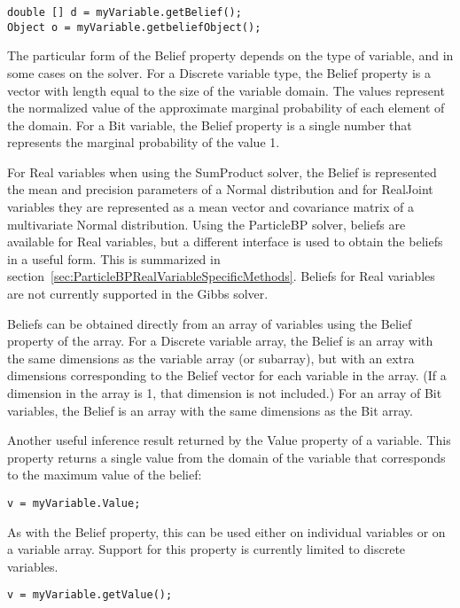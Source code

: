 \begin{lstlisting}
double [] d = myVariable.getBelief();
Object o = myVariable.getbeliefObject();
\end{lstlisting}
\fi

The particular form of the Belief property depends on the type of variable, and in some cases on the solver.  For a Discrete variable type, the Belief property is a vector with length equal to the size of the variable domain.  The values represent the normalized value of the approximate marginal probability of each element of the domain.  For a Bit variable, the Belief property is a single number that represents the marginal probability of the value 1.

For Real variables when using the SumProduct solver, the Belief is represented the mean and precision parameters of a Normal distribution and for RealJoint variables they are represented as a mean vector and covariance matrix of a multivariate Normal distribution.  Using the ParticleBP solver, beliefs are available for Real variables, but a different interface is used to obtain the beliefs in a useful form.  This is summarized in section~\ref{sec:ParticleBPRealVariableSpecificMethods}.  Beliefs for Real variables are not currently supported in the Gibbs solver.

\ifmatlab
Beliefs can be obtained directly from an array of variables using the Belief property of the array.  For a Discrete variable array, the Belief is an array with the same dimensions as the variable array (or subarray), but with an extra dimensions corresponding to the Belief vector for each variable in the array.  (If a dimension in the array is 1, that dimension is not included.)  For an array of Bit variables, the Belief is an array with the same dimensions as the Bit array.
\fi

Another useful inference result returned by the Value property of a variable.  This property returns a single value from the domain of the variable that corresponds to the maximum value of the belief:

\ifmatlab
\begin{lstlisting}
v = myVariable.Value;
\end{lstlisting}

As with the Belief property, this can be used either on individual variables or on a variable array.  Support for this property is currently limited to discrete variables.

\fi

\ifjava
\begin{lstlisting}
v = myVariable.getValue();
\end{lstlisting}
\fi

